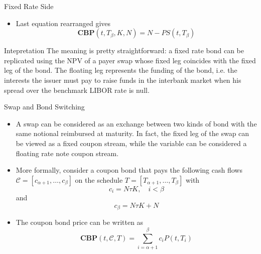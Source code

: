 \documentclass{beamer}
\begin{document}
\begin{frame}{Fixed Rate Side}
	\begin{itemize}
		\item Last equation rearranged gives
		\begin{equation}
			\textbf{CBP}(t,T_\beta,K,N) = N - PS(t,T_\beta)
		\end{equation}
	\end{itemize}
	\begin{block}{Intepretation}
		The meaning is pretty straightforward: a fixed rate bond can be replicated using the NPV of a payer swap whose fixed leg coincides with the fixed leg of the bond. The floating leg represents the funding of the bond, i.e. the interests the issuer must pay to raise funds in the interbank market when his spread over the benchmark LIBOR rate is null.
	\end{block}
\end{frame}

\begin{frame}{Swap and Bond Switching}
	\begin{itemize}
		\item A swap can be considered as an exchange between two kinds of bond with the same notional reimbursed at maturity. In fact, the fixed leg of the swap can be viewed as a fixed coupon stream, while the variable can be considered a floating rate note coupon stream. 
		\item More formally, consider a coupon bond that pays the following cash flows
		\newline
		$\mathcal{C}=[c_{\alpha+1},\ldots,c_\beta]$	on the schedule
		$T = [T_{\alpha+1},\ldots,T_\beta]$ with 
		\begin{equation*}
			c_i = N\tau K,\quad i<\beta
		\end{equation*}
		and 
		\begin{equation*}
			c_\beta=N\tau K+N
		\end{equation*}
		\item The coupon bond price can be written as
		\begin{equation}
			\textbf{CBP}(t,\mathcal{C},T)=\sum_{i=\alpha+1}^{\beta}c_i P(t,T_i)
		\end{equation}
	\end{itemize}
\end{frame}
\end{document}
